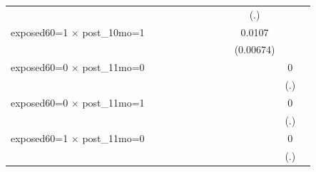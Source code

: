 \begin{table}[htbp]
\begin{tabular}{l*{11}{c}}
                    &                     &                     &                     &                     &                     &                     &                     &                     &         (.)         &                     &                     \\
\addlinespace
exposed60=1 $\times$ post\_10mo=1&                     &                     &                     &                     &                     &                     &                     &                     &      0.0107         &                     &                     \\
                    &                     &                     &                     &                     &                     &                     &                     &                     &   (0.00674)         &                     &                     \\
\addlinespace
exposed60=0 $\times$ post\_11mo=0&                     &                     &                     &                     &                     &                     &                     &                     &                     &           0         &                     \\
                    &                     &                     &                     &                     &                     &                     &                     &                     &                     &         (.)         &                     \\
\addlinespace
exposed60=0 $\times$ post\_11mo=1&                     &                     &                     &                     &                     &                     &                     &                     &                     &           0         &                     \\
                    &                     &                     &                     &                     &                     &                     &                     &                     &                     &         (.)         &                     \\
\addlinespace
exposed60=1 $\times$ post\_11mo=0&                     &                     &                     &                     &                     &                     &                     &                     &                     &           0         &                     \\
                    &                     &                     &                     &                     &                     &                     &                     &                     &                     &         (.)         &                     \\

\end{tabular}
\end{table}
